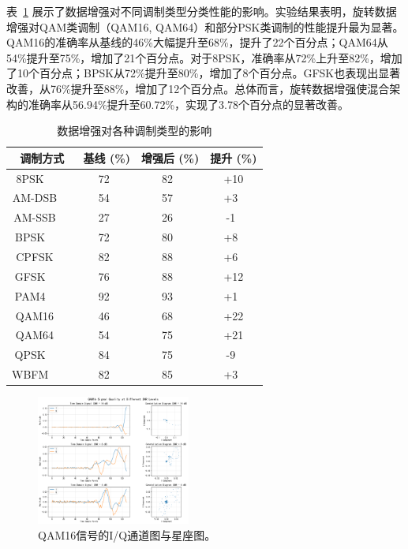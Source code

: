 \documentclass{article}
\begin{document}
表~\ref{tab:data_augmentation_results} 展示了数据增强对不同调制类型分类性能的影响。实验结果表明，旋转数据增强对QAM类调制（QAM16, QAM64）和部分PSK类调制的性能提升最为显著。QAM16的准确率从基线的46\%大幅提升至68\%，提升了22个百分点；QAM64从54\%提升至75\%，增加了21个百分点。对于8PSK，准确率从72\%上升至82\%，增加了10个百分点；BPSK从72\%提升至80\%，增加了8个百分点。GFSK也表现出显著改善，从76\%提升至88\%，增加了12个百分点。总体而言，旋转数据增强使混合架构的准确率从56.94\%提升至60.72\%，实现了3.78个百分点的显著改善。

\begin{table}[!htbp]
\centering
\caption{数据增强对各种调制类型的影响}
\label{tab:data_augmentation_results}
\begin{tabular}{@{}cccc@{}}
\toprule
调制方式 & 基线 (\%) & 增强后 (\%) & 提升 (\%) \\
\midrule
8PSK     & 72  & 82  & +10 \\
AM-DSB   & 54  & 57  & +3  \\
AM-SSB   & 27  & 26  & -1  \\
BPSK     & 72  & 80  & +8  \\
CPFSK    & 82  & 88  & +6  \\
GFSK     & 76  & 88  & +12 \\
PAM4     & 92  & 93  & +1  \\
QAM16    & 46  & 68  & +22 \\
QAM64    & 54  & 75  & +21 \\
QPSK     & 84  & 75  & -9  \\
WBFM     & 82  & 85  & +3  \\
\bottomrule
\end{tabular}
\end{table}

\begin{figure}[htbp]
\centering
\includegraphics[width=0.45\textwidth]{figure/QAM16_rotation.png}
\caption{QAM16信号的I/Q通道图与星座图。}
\label{fig:rotation_augmentation}
\end{figure}
\end{document}
